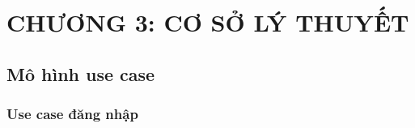 \fontsize{14}{20}\selectfont
		
\section*{CHƯƠNG 3: CƠ SỞ LÝ THUYẾT}
\fontsize{14}{20}\selectfont
\setcounter{section}{3}
\subsection{ Mô hình use case }


\fontsize{14}{20}\selectfont
\subsubsection{Use case đăng nhập}
\fontsize{13}{13}\selectfont

